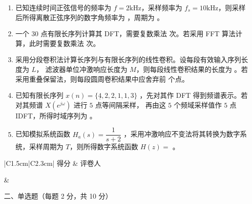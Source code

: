 \documentclass[UTF8,a4paper,12pt]{ctexart}
\newcommand{\blank}[1][3cm]{\underline{\hspace{#1}}}
\begin{document}
\vspace{1.2em}

\begin{enumerate}[label=\arabic*., leftmargin=2em, itemsep=1.25em]

\item 已知连续时间正弦信号的频率为 $f=2\mathrm{kHz}$，采样频率为
$f_s=10\mathrm{kHz}$，则采样后所得离散正弦序列的数字角频率为
\blank[2cm]
，周期为
\blank[2cm]
。

\item 一个 $30$ 点有限长序列计算其 DFT，需要复数乘法
\blank[2cm]
次。若采用 FFT 算法计算，此时需要复数乘法
\blank[2cm]
次。

\item 采用分段卷积法计算长序列与有限长序列的线性卷积。设每段有效输入序列长度为 $L$，
滤波器单位冲激响应长度为 $M$，则每段线性卷积结果的长度为
\blank[2cm]
。若采用重叠保留法，则每段圆周卷积结果中应舍弃前
\blank[2cm]
个点。

\item 已知有限长序列
$
x(n)=\{\underline{4},2,2,1,1,3\}
$
，先对其作 DFT 得到频谱表示。若对其频谱 $X(e^{j\omega})$ 进行 $5$ 点等间隔采样，
再由这 $5$ 个频域采样值作 $5$ 点 IDFT，所得时域序列为
\blank[4cm]
。
\item 已知模拟系统函数
$
H_a(s)=\dfrac{1}{s+2}
$
，采用冲激响应不变法将其转换为数字系统，采样周期为 $T$，则所得数字系统函数
$
H(z)=
$
\blank[4cm]
。

\end{enumerate}

\vspace{2.4em}

\noindent
\begin{minipage}[t]{0.25\textwidth}
\renewcommand{\arraystretch}{1.5}
\begin{tabular}{|C{1.5cm}|C{2.3cm}|}
\hline
得分 & 评卷人 \\
\hline
\rule{0pt}{0.8cm}&  \\
\hline
\end{tabular}
\end{minipage}
\begin{minipage}[t]{0.72\textwidth}
\vspace{1.0cm}
\begin{center}
{\heiti 二、单选题（每题 2 分，共 10 分）}
\end{center}
\end{minipage}

\vspace{1.2em}
\end{document}

